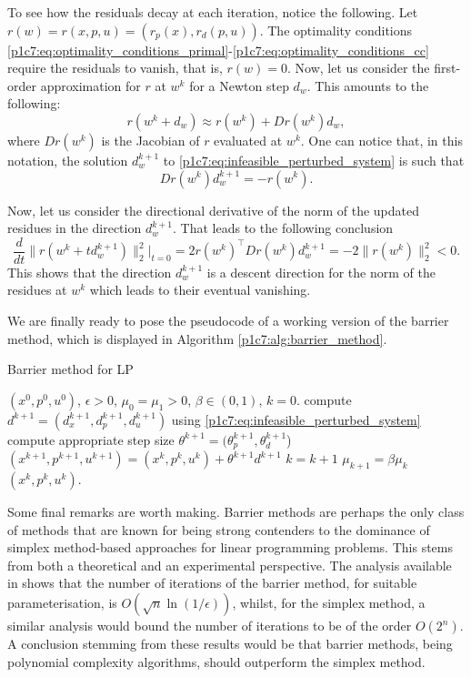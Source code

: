 To see how the residuals decay at each iteration, notice the following. Let $r(w) = r(x,p,u) = (r_p(x), r_d(p,u))$. The optimality conditions \eqref{p1c7:eq:optimality_conditions_primal}-\eqref{p1c7:eq:optimality_conditions_cc} require the residuals to vanish, that is, $r(w) = 0$. Now, let us consider the first-order approximation for $r$ at $w^k$ for a Newton step $d_w$. This amounts to the following:
	$$
	r(w^k + d_w) \approx r(w^k) + Dr(w^k)d_w,
	$$
	where $Dr(w^k)$ is the Jacobian of $r$ evaluated at $w^k$. One can notice that, in this notation, the solution $d_w^{k+1}$ to \eqref{p1c7:eq:infeasible_perturbed_system} is such that 
		$$
		Dr(w^k) d_w^{k+1} = -r(w^k).
		$$

Now, let us consider the directional derivative of the norm of the updated residues in the direction $d_w^{k+1}$. That leads to the following conclusion
	\begin{equation*}
		\frac{d}{dt} \big\| r(w^k + td_w^{k+1}) \big\|_2^2 \Big|_{t = 0} = 2r(w^k)^\top Dr(w^k)d_w^{k+1} = -2 \| r(w^k) \|_2^2 < 0.
	\end{equation*}
	This shows that the direction $d_w^{k+1}$ is a descent direction for the norm of the residues at $w^k$ which leads to their eventual vanishing.	
	
We are finally ready to pose the pseudocode of a working version of the barrier method, which is displayed in Algorithm \ref{p1c7:alg:barrier_method}.
	\captionsetup[algorithm]{font=footnotesize}
	\begin{algorithm}[H]
	\caption{Barrier method for LP} \label{p1c7:alg:barrier_method}
	\begin{algorithmic}[1] 
	  $(x^0, p^0, u^0)$, $\epsilon > 0$, $\mu_0 = \mu_1>0$, $\beta \in (0,1)$, $k = 0$. 
	    \State compute $d^{k+1} = (d_x^{k+1}, d_p^{k+1}, d_u^{k+1})$ using \eqref{p1c7:eq:infeasible_perturbed_system} 
	    \State compute appropriate step size $\theta^{k+1} = (\theta_p^{k+1}, \theta_d^{k+1}$)
	    \State $(x^{k+1}, p^{k+1}, u^{k+1}) = (x^k, p^k, u^k) + \theta^{k+1}d^{k+1}$
	    \State $k = k+1$
	    \State $\mu_{k+1} = \beta\mu_k$
	\EndWhile
	 $(x^k, p^k, u^k)$.
	\end{algorithmic} 
	\end{algorithm}
	
Some final remarks are worth making. Barrier methods are perhaps the only class of methods that are known for being strong contenders to the dominance of simplex method-based approaches for linear programming problems. This stems from both a theoretical and an experimental perspective. The analysis available in \cite{gondzio2012interior} shows that the number of iterations of the barrier method, for suitable parameterisation, is $O(\sqrt{n}\ln(1/\epsilon))$, whilst, for the simplex method, a similar analysis would bound the number of iterations to be of the order $O(2^n)$. A conclusion stemming from these results would be that barrier methods, being polynomial complexity algorithms, should outperform the simplex method.

